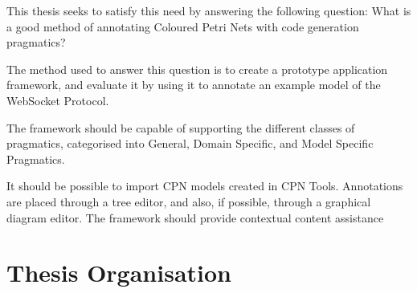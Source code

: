This thesis seeks to satisfy this need by answering the following
question: What is a good method of annotating Coloured Petri Nets with code
generation pragmatics?

The method used to answer this question is to create a prototype application
framework, and evaluate it by using it to annotate an example model of the
WebSocket Protocol.

The framework should be capable of supporting the different classes of
pragmatics, categorised into General, Domain Specific, and Model Specific
Pragmatics.

It should be possible to import CPN models created in CPN Tools. Annotations are
placed through a tree editor, and also, if possible, through a graphical diagram
editor. The framework should provide contextual content assistance

\section{Thesis Organisation}

